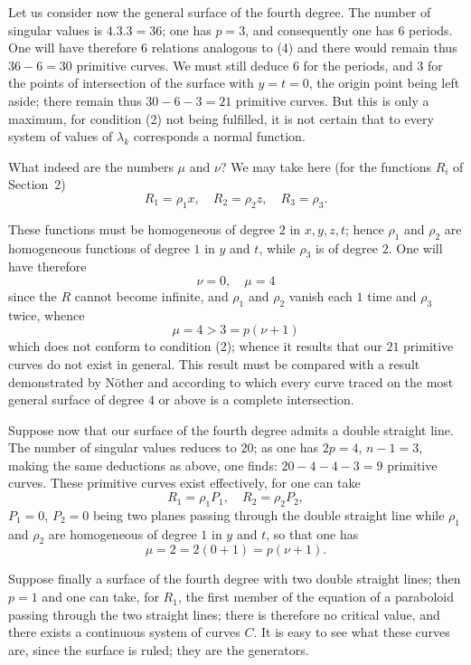\documentclass{article}
\begin{document}
Let us consider now the general surface of the fourth degree. The number of singular values is $4.3.3 = 36$; one has $p = 3$, and
consequently one has $6$ periods. One will have therefore $6$ relations analogous to (4) and there would remain thus $36 - 6 = 30$ primitive curves. We must still deduce $6$ for the periods, and $3$ for the points of intersection of the surface with $y = t = 0$, the origin point being left aside; there remain thus $30 - 6 - 3 = 21$ primitive curves. But this is only a maximum, for condition (2) not being fulfilled, it is not certain that to every system of values of $\lambda_{k}$ corresponds a normal function.

What indeed are the numbers $\mu$ and $\nu$? We may take here (for the functions $R_{i}$ of Section~2)
\[
R_{1} = \rho_{1} x, \quad R_{2} = \rho_{2} z, \quad R_{3} = \rho_{3}.
\]

These functions must be homogeneous of degree $2$ in $x, y, z, t$; hence $\rho_{1}$ and $\rho_{2}$ are homogeneous functions of degree $1$ in $y$ and $t$, while $\rho_{3}$ is of degree $2$. One will have therefore
\[
\nu = 0, \quad \mu = 4
\]
since the $R$ cannot become infinite, and $\rho_{1}$ and $\rho_{2}$ vanish each $1$ time and $\rho_{3}$ twice, whence
\[
\mu = 4 > 3 = p(\nu + 1)
\]
which does not conform to condition (2); whence it results that our $21$ primitive curves do not exist in general. This result must be compared with a result demonstrated by Nöther and according to which every curve traced on the most general surface of degree $4$ or above is a complete intersection.

Suppose now that our surface of the fourth degree admits a double straight line. The number of singular values reduces to $20$; as one has $2p = 4$, $n - 1 = 3$, making the same deductions as above, one finds: $20 - 4 - 4 - 3 = 9$ primitive curves. These primitive curves exist effectively, for one can take
\[
R_{1} = \rho_{1} P_{1}, \quad R_{2} = \rho_{2} P_{2},
\]
$P_{1} = 0$, $P_{2} = 0$ being two planes passing through the double straight line while $\rho_{1}$ and $\rho_{2}$ are homogeneous of degree $1$ in $y$ and $t$, so that one has
\[
\mu = 2 = 2(0 + 1) = p(\nu + 1).
\]

Suppose finally a surface of the fourth degree with two double straight lines; then $p = 1$ and one can take, for $R_{1}$, the first member of the equation of a paraboloid passing through the two straight lines; there is therefore no critical value, and there exists a continuous system of curves $C$. It is easy to see what these curves are, since the surface is ruled; they are the generators.
\end{document}
